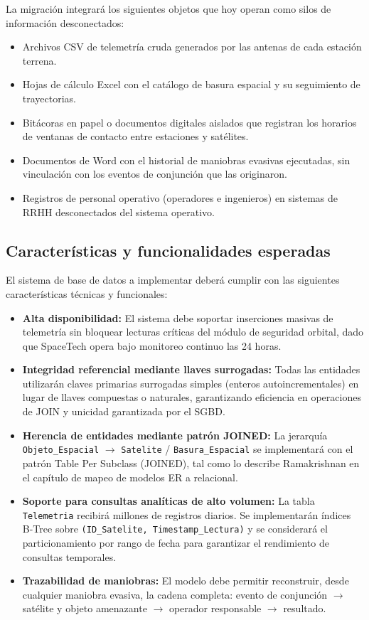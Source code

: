 La migración integrará los siguientes objetos que hoy operan como silos de información desconectados:
\begin{itemize}
    \item Archivos CSV de telemetría cruda generados por las antenas de cada estación terrena.
    \item Hojas de cálculo Excel con el catálogo de basura espacial y su seguimiento de trayectorias.
    \item Bitácoras en papel o documentos digitales aislados que registran los horarios de ventanas de contacto entre estaciones y satélites.
    \item Documentos de Word con el historial de maniobras evasivas ejecutadas, sin vinculación con los eventos de conjunción que las originaron.
    \item Registros de personal operativo (operadores e ingenieros) en sistemas de RRHH desconectados del sistema operativo.
\end{itemize}

\subsection{Características y funcionalidades esperadas}

El sistema de base de datos a implementar deberá cumplir con las siguientes características técnicas y funcionales:

\begin{itemize}
    \item \textbf{Alta disponibilidad:} El sistema debe soportar inserciones masivas de telemetría sin bloquear lecturas críticas del módulo de seguridad orbital, dado que SpaceTech opera bajo monitoreo continuo las 24 horas.
    \item \textbf{Integridad referencial mediante llaves surrogadas:} Todas las entidades utilizarán claves primarias surrogadas simples (enteros autoincrementales) en lugar de llaves compuestas o naturales, garantizando eficiencia en operaciones de JOIN y unicidad garantizada por el SGBD.
    \item \textbf{Herencia de entidades mediante patrón JOINED:} La jerarquía \texttt{Objeto\_Espacial} $\rightarrow$ \texttt{Satelite} / \texttt{Basura\_Espacial} se implementará con el patrón Table Per Subclass (JOINED), tal como lo describe Ramakrishnan en el capítulo de mapeo de modelos ER a relacional.
    \item \textbf{Soporte para consultas analíticas de alto volumen:} La tabla \texttt{Telemetria} recibirá millones de registros diarios. Se implementarán índices B-Tree sobre \texttt{(ID\_Satelite, Timestamp\_Lectura)} y se considerará el particionamiento por rango de fecha para garantizar el rendimiento de consultas temporales.
    \item \textbf{Trazabilidad de maniobras:} El modelo debe permitir reconstruir, desde cualquier maniobra evasiva, la cadena completa: evento de conjunción $\rightarrow$ satélite y objeto amenazante $\rightarrow$ operador responsable $\rightarrow$ resultado.
\end{itemize}


